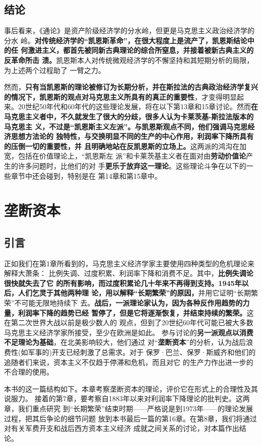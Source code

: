 \section{结论}
事后看来，《通论》是资产阶级经济学的分水岭，但更是马克思主义政治经济学的分水
岭。\textbf{对传统经济学的“凯恩斯革命”，在很大程度上是流产了，凯恩斯结论中的任
  何激进主义，都首先被同新古典理论的综合所窒息，并接着被新古典主义的反革命所击
  溃。}凯恩斯本人对传统微观经济学的不懈坚持和其短期分析的局限，为上述两个过程助了
一臂之力。

然而，\textbf{只有当凯恩斯的理论被修订为长期分析，并在斯拉法的古典政治经济学复兴
  的情况下，凯恩斯的观点对马克思主义所具有的真正的重要性}，才变得明显起
来。20世纪50年代和60年代的这些理论发展，将在以下第13章和15章讨论。然而\textbf{在
  马克思主义者中，不久就发生了很大的分歧，很多人认为卡莱茨基-斯拉法版本的马克思主
  义，不过是“凯恩斯主义左派”。与凯恩斯观点不同，他们强调马克思经济思想方法论的
  独特性，与交换明显不同的生产的中心作用，利润率下降所具有的压倒一切的重要性，并
  且明确地站在反凯恩斯的立场上。}这两派的鸿沟在加宽，包括在价值理论上，“凯恩斯左
派”和卡莱茨基主义者在面对由\textbf{劳动价值论}产生的许多问题时，比他们的对
手\textbf{更乐于放弃这一理论}。这些理论斗争在以下的一些章节中还会碰到，特别是在
第14章和第15章中。


\chapter{垄断资本}
\section{引言}
正如我们在第1章所看到的，马克思主义经济学家主要使用四种类型的危机理论来解释大萧条：
比例失调、过度积累、利润率下降和消费不足。其中，\textbf{比例失调论很快就失去了它
  的所有影响，而过度积累论几十年来不再得到支持。1945年以后，人们乞灵于其他两种理
  论，用以解释“长期繁荣”的原因，}并用它证明“长期繁荣”不可能无限地持续下
去。\textbf{战后，一派理论家认为，因为各种反作用趋势的力量，利润率下降的趋势已经
  暂停了，但是它将逐渐恢复，并结束持续的繁荣。}这在第二次世界大战以前是极少数人的
观点，但到了20世纪60年代可能已被大多数马克思主义经济学家所接受，至少在欧洲是如此。
参与讨论的\textbf{另一派观点以消费不足理论为基础}，在北美影响较大，他们通过
对“\textbf{垄断资本}”的分析，认为战后浪费性(如军事的)开支已经刺激了总需求。对于
保罗·巴兰、保罗·斯威齐和他们的追随者们来说，资本主义不仅趋于停滞和危机，而且对它
的生产力作出进一步的不合理的使用。

本书的这一篇结构如下。本章考察垄断资本的理论，评价它在形式上的合理性及其说服力。
接着的第7章，要考察自1883年以来对利润率下降理论的批判史。这两章，我们重点研究
到“长期繁荣”结束时期——严格说是到1973年——的理论发展过程，把其后争论的细节问题
放到本书最后一篇的第16章。在第8章，我们将通过对有关军费开支和战后西方资本主义经济
成就之间关系的讨论，对本篇作出结论。

